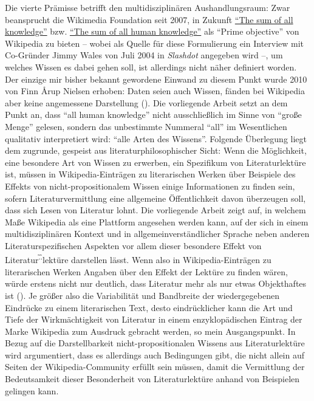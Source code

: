 \documentclass[fontsize=12pt]{scrartcl}
\begin{document}
Die vierte Pr\"amisse betrifft den multidisziplin\"aren Aushandlungsraum: Zwar be\-an\-sprucht die Wi\-ki\-me\-dia Foun\-da\-tion seit 2007, in Zukunft \href{http://wikimediafoundation.org/w/index.php?title=Vision\&oldid=21860}{"`The sum of all know\-ledge"'} bzw. \href{https://en.Wikipedia.org/w/index.php?title=Wikipedia:Prime_objective&oldid=497516953}{"`The sum of all human know\-ledge"'} als "`Prime objective"' von Wi\-ki\-pe\-di\-a zu bieten -- wobei als Quelle f\"ur diese Formulierung ein Interview mit Co-Gr\"under Jimmy Wales von Juli 2004 in \textit{Slashdot} angegeben wird --, um welches Wissen es dabei gehen soll, ist al\-ler\-dings nicht n\"aher definiert worden. Der einzige mir bis\-her bekannt gewordene Einwand zu diesem Punkt wurde 2010 von Finn \r{A}rup Nielsen erhoben: Daten seien auch Wissen, f\"anden bei Wi\-ki\-pe\-dia aber keine angemessene Darstellung (\cite{Nielsen2010}). Die vorliegende Arbeit setzt an dem Punkt an, dass "`all human know\-ledge"' nicht ausschlie{\ss}lich im Sinne von "`gro{\ss}e Menge"' gelesen, sondern das unbestimmte Nummeral "`all"' im We\-sent\-lichen qualitativ interpretiert wird: "`alle Arten des Wissens"'. Folgende \"Uberlegung liegt dem zugrunde, gespeist aus li\-te\-ra\-tur\-philosophischer Sicht: Wenn die M\"oglichkeit, eine besondere Art von Wissen zu erwerben, ein Spezifikum von Li\-te\-ra\-tur\-lekt\"ure ist, m\"ussen in Wi\-ki\-pe\-dia-Eintr\"agen zu li\-te\-ra\-rischen Werken \"uber Beispiele des Effekts von nicht-pro\-po\-si\-ti\-o\-na\-lem Wissen einige Informationen zu finden sein, sofern Li\-te\-ra\-tur\-ver\-mitt\-lung eine allgemeine \"Of\-fent\-lichkeit davon \"uberzeugen soll, dass sich Lesen von Li\-te\-ra\-tur lohnt. Die vorliegende Arbeit zeigt auf, in welchem Ma{\ss}e Wi\-ki\-pe\-dia als eine Plattform angesehen werden kann, auf der sich in einem multidisziplin\"aren Kontext und in allgemeinverst\"andlicher Sprache neben anderen Li\-te\-ra\-tur\-spezifischen Aspekten vor allem dieser besondere Effekt von Li\-te\-ra\-tur\textsuperscript{\~.\~.}lekt\"ure dar\-stel\-len l\"asst. Wenn also in Wi\-ki\-pe\-dia-Eintr\"agen zu li\-te\-ra\-rischen Werken Angaben \"uber den Effekt der Lekt\"ure zu finden w\"aren, w\"urde erstens nicht nur deutlich, dass Li\-te\-ra\-tur mehr als nur etwas Objekthaftes ist (\cite{Attridge2004}). Je gr\"o{\ss}er also die Variabilit\"at und Bandbreite der wiedergegebenen Eindr\"ucke zu einem li\-te\-ra\-rischen Text, desto eindr\"ucklicher kann die Art und Tiefe der Wirkm\"achtigkeit von Li\-te\-ra\-tur in einem enzy\-klop\"adischen Eintrag der Marke Wi\-ki\-pe\-dia zum Ausdruck gebracht werden, so mein Ausgangspunkt. In Bezug auf die Darstellbarkeit nicht-pro\-po\-si\-ti\-o\-na\-len Wissens aus Li\-te\-ra\-tur\-lekt\"ure wird argumentiert, dass es al\-ler\-dings auch Bedingungen gibt, die nicht allein auf Seiten der Wi\-ki\-pe\-dia-Community erf\"ullt sein m\"ussen, damit die Ver\-mitt\-lung der Bedeutsamkeit dieser Besonderheit von Li\-te\-ra\-tur\-lekt\"ure anhand von Beispielen gelingen kann.
\end{document}
